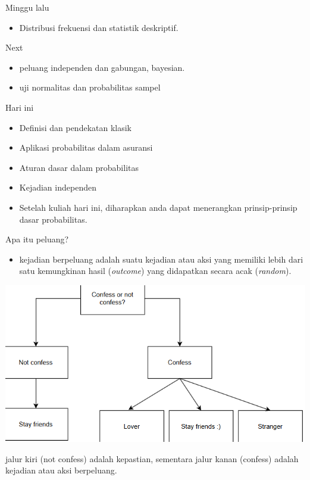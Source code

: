 \documentclass[
  ignorenonframetext,
]{beamer}
\providecommand{\tightlist}{%
  \setlength{\itemsep}{0pt}\setlength{\parskip}{0pt}}\usepackage{longtable,booktabs,array}
\begin{document}
\begin{frame}{Minggu lalu}
\label{minggu-lalu}
\begin{itemize}
\tightlist
\item
  Distribusi frekuensi dan statistik deskriptif.
\end{itemize}

\begin{block}{Next}
\label{next}
\begin{itemize}
\tightlist
\item
  peluang independen dan gabungan, bayesian.
\item
  uji normalitas dan probabilitas sampel
\end{itemize}
\end{block}
\end{frame}

\begin{frame}{Hari ini}
\label{hari-ini}
\begin{itemize}[<+->]
\item
  Definisi dan pendekatan klasik
\item
  Aplikasi probabilitas dalam asuransi
\item
  Aturan dasar dalam probabilitas
\item
  Kejadian independen
\item
  Setelah kuliah hari ini, diharapkan anda dapat menerangkan
  prinsip-prinsip dasar probabilitas.
\end{itemize}
\end{frame}

\begin{frame}[s]{Apa itu peluang?}
\label{apa-itu-peluang}
\begin{itemize}
\tightlist
\item
  kejadian berpeluang adalah suatu kejadian atau aksi yang memiliki
  lebih dari satu kemungkinan hasil (\emph{outcome}) yang didapatkan
  secara acak (\emph{random}).
\end{itemize}

\pause

\includegraphics{ea.png}

\pause

jalur kiri (not confess) adalah kepastian, sementara jalur kanan
(confess) adalah kejadian atau aksi berpeluang.
\end{frame}
\end{document}
